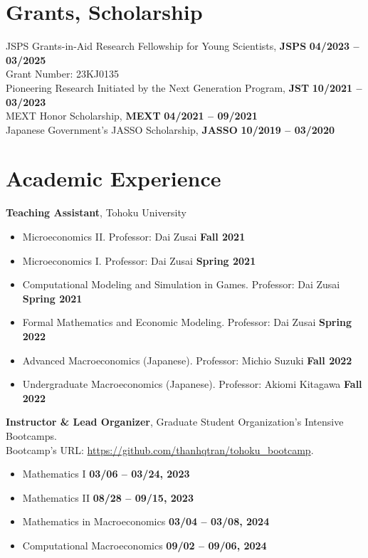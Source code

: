 \documentclass[margin,line]{res}
\begin{document}
\begin{resume}
\vspace{4mm}

\section{\sc Grants, Scholarship}
JSPS Grants-in-Aid Research Fellowship for Young Scientists, {\bf JSPS} \hfill {\bf 04/2023 -- 03/2025}\\
Grant Number: 23KJ0135 \\
Pioneering Research Initiated by the Next Generation Program, {\bf JST} \hfill {\bf 10/2021 -- 03/2023}\\
MEXT Honor Scholarship, {\bf MEXT} \hfill {\bf 04/2021 -- 09/2021}\\
Japanese Government's JASSO Scholarship, {\bf JASSO} \hfill {\bf 10/2019 -- 03/2020}\\

\vspace{4mm}

\section{\sc Academic Experience}
{\bf Teaching Assistant}, Tohoku University
\begin{itemize}
\item[ ] Microeconomics II. Professor: Dai Zusai \hfill {\bf Fall 2021}
\item[ ] Microeconomics I. Professor: Dai Zusai \hfill {\bf Spring 2021}
\item[ ] Computational Modeling and Simulation in Games. Professor: Dai Zusai \hfill {\bf Spring 2021}
\item[ ] Formal Mathematics and Economic Modeling. Professor: Dai Zusai \hfill {\bf Spring 2022}
\item[ ] Advanced Macroeconomics (Japanese). Professor: Michio Suzuki \hfill {\bf Fall 2022}
\item[ ] Undergraduate Macroeconomics (Japanese). Professor: Akiomi Kitagawa \hfill {\bf Fall 2022}
\end{itemize}

{\bf Instructor \& Lead Organizer}, Graduate Student Organization's Intensive Bootcamps. \\
Bootcamp's URL: \url{https://github.com/thanhqtran/tohoku_bootcamp}.
\begin{itemize}
\item[ ] Mathematics I  \hfill {\bf 03/06 -- 03/24, 2023}
\item[ ] Mathematics II \hfill {\bf 08/28 -- 09/15, 2023}
\item[ ] Mathematics in Macroeconomics \hfill {\bf 03/04 -- 03/08, 2024}
\item[ ] Computational Macroeconomics \hfill {\bf 09/02 -- 09/06, 2024}
\end{itemize}


\end{resume}
\end{document}
